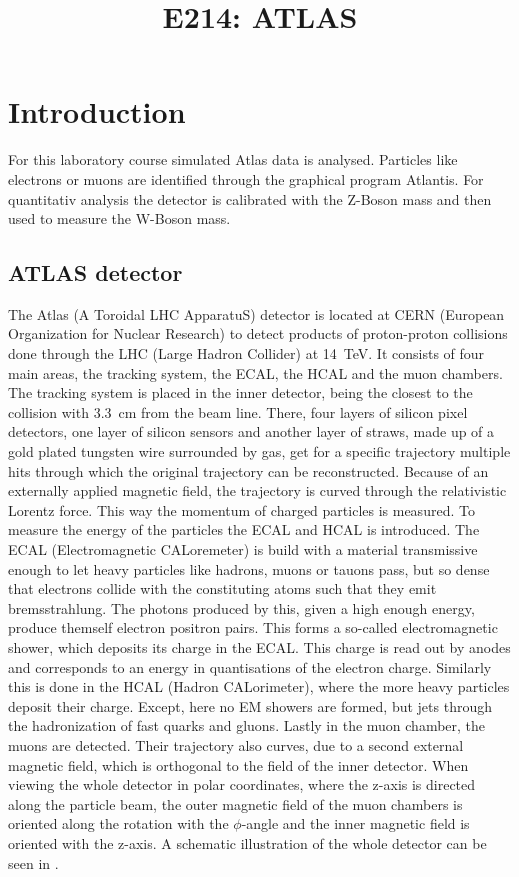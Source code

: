 \documentclass[sn-mathphys-num,icol]{sn-jnl}
\theoremstyle{thmstyleone}
\theoremstyle{thmstyletwo}
\theoremstyle{thmstylethree}
\begin{document}
\title{E214: ATLAS}
\author*[1]{ }\email{}
\author*[1]{ }
\maketitle
\section{Introduction}
For this laboratory course simulated Atlas data is analysed. Particles like electrons or muons are identified through the graphical program Atlantis. For quantitativ analysis the detector is calibrated with the Z-Boson mass and then used to measure the W-Boson mass.
\subsection{ATLAS detector}
The Atlas (A Toroidal LHC ApparatuS) detector is located at CERN (European Organization for Nuclear Research) to detect products of proton-proton collisions done through the LHC (Large Hadron Collider) at \SI{14}{TeV}\cite{cern_org}.
It consists of four main areas, the tracking system, the ECAL, the HCAL and the muon chambers. The tracking system is placed in the inner detector, being the closest to the collision with \SI{3.3}{cm} from the beam line. There, four layers of silicon pixel detectors, one layer of silicon sensors and another layer of straws, made up of a gold plated tungsten wire surrounded by gas, get for a specific trajectory multiple hits through which the original trajectory can be reconstructed.\cite{cern_org} Because of an externally applied magnetic field, the trajectory is curved through the relativistic Lorentz force. This way the momentum of charged particles is measured. To measure the energy of the particles the ECAL and HCAL is introduced. The ECAL (Electromagnetic CALoremeter) is build with a material transmissive enough to let heavy particles like hadrons, muons or tauons pass, but so dense that electrons collide with the constituting atoms such that they emit bremsstrahlung. The photons produced by this, given a high enough energy, produce themself electron positron pairs. This forms a so-called electromagnetic shower, which deposits its charge in the ECAL. This charge is read out by anodes and corresponds to an energy in quantisations of the electron charge. Similarly this is done in the HCAL (Hadron CALorimeter), where the more heavy particles deposit their charge. Except, here no EM showers are formed, but jets through the hadronization of fast quarks and gluons. Lastly in the muon chamber, the muons are detected.\cite{bonn_physics601_atlas_2025} Their trajectory also curves, due to a second external magnetic field, which is orthogonal to the field of the inner detector. When viewing the whole detector in polar coordinates, where the z-axis is directed along the particle beam, the outer magnetic field of the muon chambers is oriented along the rotation with the $\phi$-angle and the inner magnetic field is oriented with the z-axis. A schematic illustration of the whole detector can be seen in .
\end{document}
